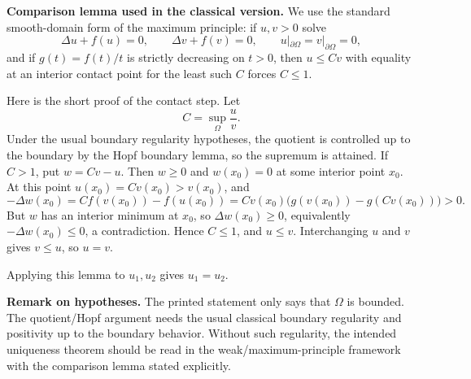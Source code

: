 \begin{solution}
\textbf{Comparison lemma used in the classical version.}
We use the standard smooth-domain form of the maximum principle: if \(u,v>0\) solve
\[
\Delta u+f(u)=0,\qquad \Delta v+f(v)=0,\qquad u|_{\partial\Omega}=v|_{\partial\Omega}=0,
\]
and if \(g(t)=f(t)/t\) is strictly decreasing on \(t>0\), then \(u\leq Cv\) with equality at an interior contact point for the least such \(C\) forces \(C\leq1\).

Here is the short proof of the contact step. Let
\[
C=\sup_\Omega \frac{u}{v}.
\]
Under the usual boundary regularity hypotheses, the quotient is controlled up to the boundary by the Hopf boundary lemma, so the supremum is attained. If \(C>1\), put \(w=Cv-u\). Then \(w\geq0\) and \(w(x_0)=0\) at some interior point \(x_0\). At this point \(u(x_0)=Cv(x_0)>v(x_0)\), and
\[
-\Delta w(x_0)
=C f(v(x_0))-f(u(x_0))
=Cv(x_0)\bigl(g(v(x_0))-g(Cv(x_0))\bigr)>0.
\]
But \(w\) has an interior minimum at \(x_0\), so \(\Delta w(x_0)\geq0\), equivalently \(-\Delta w(x_0)\leq0\), a contradiction. Hence \(C\leq1\), and \(u\leq v\). Interchanging \(u\) and \(v\) gives \(v\leq u\), so \(u=v\).

Applying this lemma to \(u_1,u_2\) gives \(u_1=u_2\).

\textbf{Remark on hypotheses.}
The printed statement only says that \(\Omega\) is bounded. The quotient/Hopf argument needs the usual classical boundary regularity and positivity up to the boundary behavior. Without such regularity, the intended uniqueness theorem should be read in the weak/maximum-principle framework with the comparison lemma stated explicitly.
\end{solution}
